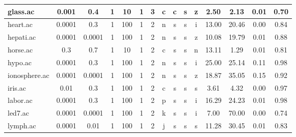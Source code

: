 \begin{table}[htbp]
\begin{tabular}{|l|c|c|c|c|c|c|c|c|c|c||c|c|c|c|}
		\hline
		glass.ac       & 0.001    & 0.4         & 1              & 10                  & 1             & 3        & c             & c      & s        & z        & 2.50           & 2.13           & 0.01           & 0.70           \\
		\hline
		heart.ac       & 0.0001   & 0.3         & 1              & 100                 & 1             & 2        & n             & s      & s        & i        & 13.00          & 20.46          & 0.00           & 0.84           \\
		\hline
		hepati.ac      & 0.0001   & 0.0001      & 1              & 100                 & 1             & 2        & n             & s      & s        & z        & 10.08          & 19.79          & 0.01           & 0.88           \\
		\hline
		horse.ac       & 0.3      & 0.7         & 1              & 10                  & 1             & 2        & c             & s      & s        & n        & 13.11          & 1.29           & 0.01           & 0.81           \\
		\hline
		hypo.ac        & 0.0001   & 0.3         & 1              & 100                 & 1             & 2        & n             & s      & s        & i        & 25.00          & 25.14          & 0.11           & 0.98           \\
		\hline
		ionosphere.ac  & 0.0001   & 0.0001      & 1              & 100                 & 1             & 2        & n             & s      & s        & z        & 18.87          & 35.05          & 0.15           & 0.92           \\
		\hline
		iris.ac        & 0.01     & 0.3         & 1              & 100                 & 1             & 2        & c             & s      & s        & s        & 3.61           & 4.32           & 0.00           & 0.97           \\
		\hline
		labor.ac       & 0.0001   & 0.3         & 1              & 100                 & 1             & 2        & p             & s      & s        & i        & 16.29          & 24.23          & 0.01           & 0.98           \\
		\hline
		led7.ac        & 0.0001   & 0.0001      & 1              & 100                 & 1             & 2        & k             & s      & s        & i        & 7.00           & 70.00          & 0.00           & 0.74           \\
		\hline
		lymph.ac       & 0.0001   & 0.01        & 1              & 100                 & 1             & 2        & j             & s      & s        & s        & 11.28          & 30.45          & 0.01           & 0.83           \\

\end{tabular}
\end{table}
